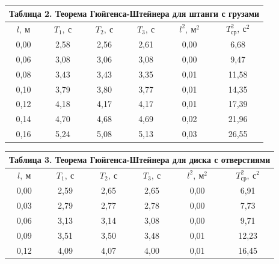 \documentclass[a4paper,14pt]{article}
\begin{document}
\begin{center}
	\begin{tabular}{|c|c|c|c|c|c|}
		\multicolumn{6}{c}{Таблица 2. Теорема Гюйгенса-Штейнера для штанги с грузами } \bigstrut[b]\\
		\hline
		$l,\ \text{м}$  & $T_{1},\ \text{с}$ & $T_{2},\ \text{с}$ & $T_{3},\ \text{с}$ & $l^2,\ \text{м}^2$ & $T_{\text{ср}}^2,\ \text{с}^2$ \bigstrut\\
		\hline
		0,00  & 2,58  & 2,56  & 2,61  & 0,00  & 6,68 \bigstrut\\
		\hline
		0,06  & 3,08  & 3,06  & 3,08  & 0,00  & 9,47 \bigstrut\\
		\hline
		0,08  & 3,43  & 3,43  & 3,35  & 0,01  & 11,58 \bigstrut\\
		\hline
		0,10  & 3,79  & 3,80  & 3,77  & 0,01  & 14,35 \bigstrut\\
		\hline
		0,12  & 4,18  & 4,17  & 4,17  & 0,01  & 17,39 \bigstrut\\
		\hline
		0,14  & 4,70  & 4,68  & 4,69  & 0,02  & 21,96 \bigstrut\\
		\hline
		0,16  & 5,24  & 5,08  & 5,13  & 0,03  & 26,55 \bigstrut\\
		\hline
	\end{tabular}%
\end{center}%

\begin{center}
	\begin{tabular}{|c|c|c|c|c|c|}
		\multicolumn{6}{c}{Таблица 3. Теорема Гюйгенса-Штейнера для диска с отверстиями} \bigstrut\\
		\hline
		$l,\ \text{м}$  & $T_{1},\ \text{с}$ & $T_{2},\ \text{с}$ & $T_{3},\ \text{с}$ & $l^2,\ \text{м}^2$ & $T_{\text{ср}}^2,\ \text{с}^2$ \bigstrut\\
		\hline
		0,00  & 2,59  & 2,65  & 2,65  & 0,00  & 6,91 \bigstrut\\
		\hline
		0,03  & 2,79  & 2,77  & 2,78  & 0,00  & 7,73 \bigstrut\\
		\hline
		0,06  & 3,13  & 3,14  & 3,08  & 0,00  & 9,71 \bigstrut\\
		\hline
		0,09  & 3,51  & 3,50  & 3,48  & 0,01  & 12,23 \bigstrut\\
		\hline
		0,12  & 4,09  & 4,07  & 4,00  & 0,01  & 16,45 \bigstrut\\
		\hline
	\end{tabular}%
\end{center}%
\end{document}
